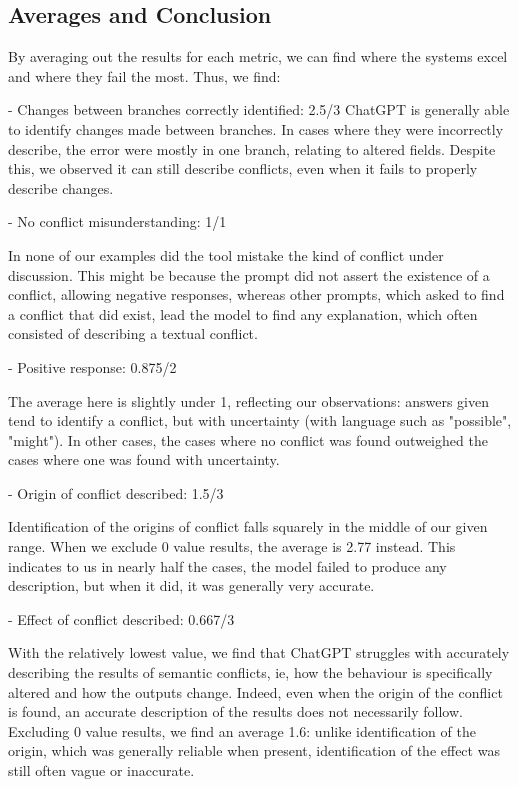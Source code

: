 \subsection{Averages and Conclusion}


By averaging out the results for each metric, we can find where the systems excel and where they fail the most. Thus, we find:

- Changes between branches correctly identified: 2.5/3
ChatGPT is generally able to identify changes made between branches. In cases where they were incorrectly describe, the error were mostly in one branch, relating to altered fields. Despite this, we observed it can still describe conflicts, even when it fails to properly describe changes.

- No conflict misunderstanding: 1/1

In none of our examples did the tool mistake the kind of conflict under discussion. This might be because the prompt did not assert the existence of a conflict, allowing negative responses, whereas other prompts, which asked to find a conflict that did exist, lead the model to find any explanation, which often consisted of describing a textual conflict.

- Positive response: 0.875/2

The average here is slightly under 1, reflecting our observations: answers given tend to identify a conflict, but with uncertainty (with language such as "possible", "might"). In other cases, the cases where no conflict was found outweighed the cases where one was found with uncertainty.

- Origin of conflict described: 1.5/3

Identification of the origins of conflict falls squarely in the middle of our given range.  When we exclude 0 value results, the average is 2.77 instead. This indicates to us in nearly half the cases, the model failed to produce any description, but when it did, it was generally very accurate.

- Effect of conflict described: 0.667/3

With the relatively lowest value, we find that ChatGPT struggles with accurately describing the results of semantic conflicts, ie, how the behaviour is specifically altered and how the outputs change. Indeed, even when the origin of the conflict is found, an accurate description of the results does not necessarily follow. Excluding 0 value results, we find an average 1.6: unlike identification of the origin, which was generally reliable when present, identification of the effect was still often vague or inaccurate.


